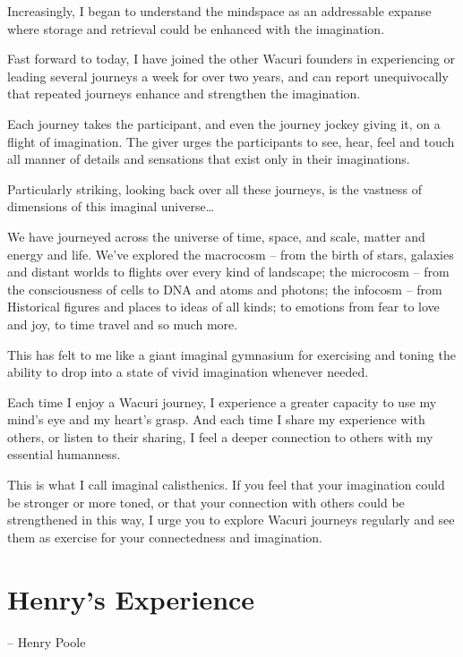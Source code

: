\documentclass[12pt]{book}
\begin{document}
Increasingly, I began to understand the mindspace as an addressable
expanse where storage and retrieval could be enhanced with the
imagination.

Fast forward to today, I have joined the other Wacuri founders in
experiencing or leading several journeys a week for over two years,
and can report unequivocally that repeated journeys enhance and
strengthen the imagination.

Each journey takes the participant, and even the journey jockey giving
it, on a flight of imagination. The giver urges the participants to
see, hear, feel and touch all manner of details and sensations that
exist only in their imaginations.

Particularly striking, looking back over all these journeys, is the
vastness of dimensions of this imaginal universe…

We have journeyed across the universe of time, space, and scale,
matter and energy and life. We've explored the macrocosm – from the
birth of stars, galaxies and distant worlds to flights over every kind
of landscape; the microcosm – from the consciousness of cells to DNA
and atoms and photons; the infocosm – from Historical figures and
places to ideas of all kinds; to emotions from fear to love and joy,
to time travel and so much more.

This has felt to me like a giant imaginal gymnasium for exercising and
toning the ability to drop into a state of vivid imagination whenever
needed.

Each time I enjoy a Wacuri journey, I experience a greater capacity to
use my mind’s eye and my heart’s grasp. And each time I share my
experience with others, or listen to their sharing, I feel a deeper
connection to others with my essential humanness.

This is what I call imaginal calisthenics. If you feel that your
imagination could be stronger or more toned, or that your connection
with others could be strengthened in this way, I urge you to explore
Wacuri journeys regularly and see them as exercise for your
connectedness and imagination.


\section{Henry's Experience}
-- Henry Poole
\end{document}
